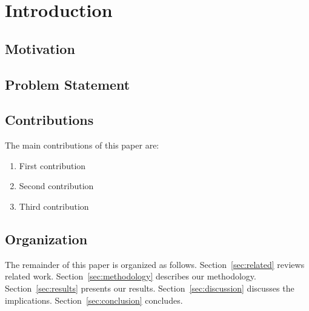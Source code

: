 \section{Introduction}


\subsection{Motivation}


\subsection{Problem Statement}


\subsection{Contributions}


The main contributions of this paper are:
\begin{enumerate}
    \item First contribution
    \item Second contribution
    \item Third contribution
\end{enumerate}

\subsection{Organization}

The remainder of this paper is organized as follows. Section~\ref{sec:related} reviews related work. Section~\ref{sec:methodology} describes our methodology. Section~\ref{sec:results} presents our results. Section~\ref{sec:discussion} discusses the implications. Section~\ref{sec:conclusion} concludes.
